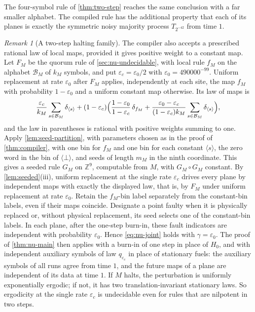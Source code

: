 \documentclass[11pt]{article}
\theoremstyle{plain}
\theoremstyle{definition}
\theoremstyle{remark}
\newtheorem{remark}[theorem]{Remark}
\newcommand{\Z}{\mathbb Z}
\newcommand{\eps}{\varepsilon}
\begin{document}
The four-symbol rule of \cref{thm:two-step} reaches the same conclusion with a far smaller alphabet. The compiled rule has the additional property that each of its planes is exactly the symmetric noisy majority process $T_{2^{-42}}$ from time $1$.

\begin{remark}[A two-step halting family]\label{rem:two-step-halting}
The compiler also accepts a prescribed rational law of local maps, provided it gives positive weight to a constant map. Let $F_M$ be the quorum rule of \cref{sec:nu-undecidable}, with local rule $f_M$ on the alphabet $\mathcal B_M$ of $k_M$ symbols, and put $\eps_c=\eps_0/2$ with $\eps_0=490000^{-99}$. Uniform replacement at rate $\eps_0$ after $F_M$ applies, independently at each site, the map $f_M$ with probability $1-\eps_0$ and a uniform constant map otherwise. Its law of maps is
\[
 \frac{\eps_c}{k_M}\sum_{s\in\mathcal B_M}\delta_{\langle s\rangle}
 +(1-\eps_c)\Bigl(\frac{1-\eps_0}{1-\eps_c}\,\delta_{f_M}
 +\frac{\eps_0-\eps_c}{(1-\eps_c)k_M}\sum_{s\in\mathcal B_M}\delta_{\langle s\rangle}\Bigr),
\]
and the law in parentheses is rational with positive weights summing to one. Apply \cref{lem:seed-partition}, with parameters chosen as in the proof of \cref{thm:compiler}, with one bin for $f_M$ and one bin for each constant $\langle s\rangle$, the zero word in the bin of $\langle\bot\rangle$, and seeds of length $m_M$ in the ninth coordinate. This gives a seeded rule $G_M$ on $\Z^9$, computable from $M$, with $G_M\circ G_M$ constant. By \cref{lem:seeded}(iii), uniform replacement at the single rate $\eps_c$ drives every plane by independent maps with exactly the displayed law, that is, by $F_M$ under uniform replacement at rate $\eps_0$. Retain the $f_M$-bin label separately from the constant-bin labels, even if their maps coincide. Designate a point faulty when it is physically replaced or, without physical replacement, its seed selects one of the constant-bin labels. In each plane, after the one-step burn-in, these fault indicators are independent with probability $\eps_0$. Hence \eqref{eq:nu-joint} holds with $\gamma=\eps_0$. The proof of \cref{thm:nu-main} then applies with a burn-in of one step in place of $H_0$, and with independent auxiliary symbols of law $q_{\eps_c}$ in place of stationary fuels: the auxiliary symbols of all runs agree from time $1$, and the future maps of a plane are independent of its data at time $1$. If $M$ halts, the perturbation is uniformly exponentially ergodic; if not, it has two translation-invariant stationary laws. So ergodicity at the single rate $\eps_c$ is undecidable even for rules that are nilpotent in two steps.


\end{remark}
\end{document}
